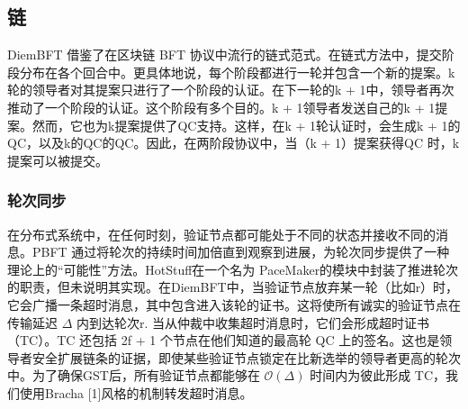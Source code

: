 \subsection{链}

DiemBFT 借鉴了在区块链 BFT 协议中流行的链式范式。在链式方法中，提交阶段分布在各个回合中。更具体地说，每个阶段都进行一轮并包含一个新的提案。k轮的领导者对其提案只进行了一个阶段的认证。在下一轮的k + 1中，领导者再次推动了一个阶段的认证。这个阶段有多个目的。k + 1领导者发送自己的k + 1提案。然而，它也为k提案提供了QC支持。这样，在k + 1轮认证时，会生成k + 1的QC，以及k的QC的QC。因此，在两阶段协议中，当（k + 1）提案获得QC 时，k提案可以被提交。

\subsubsection{轮次同步}

在分布式系统中，在任何时刻，验证节点都可能处于不同的状态并接收不同的消息。PBFT 通过将轮次的持续时间加倍直到观察到进展，为轮次同步提供了一种理论上的“可能性”方法。HotStuff在一个名为 PaceMaker的模块中封装了推进轮次的职责，但未说明其实现。在DiemBFT中，当验证节点放弃某一轮（比如r）时，它会广播一条超时消息，其中包含进入该轮的证书。这将使所有诚实的验证节点在传输延迟 $\Delta$ 内到达轮次r. 当从仲裁中收集超时消息时，它们会形成超时证书（TC）。TC 还包括 2f + 1 个节点在他们知道的最高轮 QC 上的签名。这也是领导者安全扩展链条的证据，即使某些验证节点锁定在比新选举的领导者更高的轮次中。为了确保GST后，所有验证节点都能够在 $\mathcal{O}(\Delta)$ 时间内为彼此形成 TC，我们使用Bracha [1]风格的机制转发超时消息。